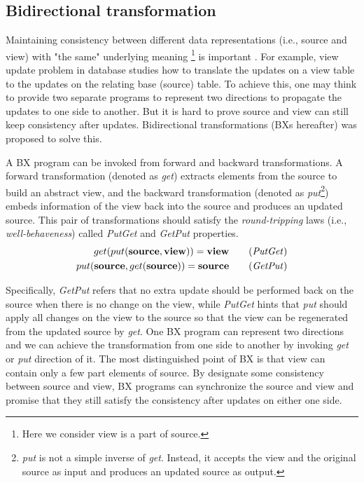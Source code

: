 \documentclass[conference]{IEEEtran}
\begin{document}
	\subsection{Bidirectional transformation}
	Maintaining consistency between different data representations (i.e., source and view) with "the same" underlying meaning \footnote{Here we consider view is a part of source.}  is important \cite{abou2018introduction}. For example, view update problem in database \cite{bancilhon1981update} studies how to translate the updates on a view table to the updates on the relating base (source) table. To achieve this, one may think to provide two separate programs to represent two directions to propagate the updates to one side to another. But it is hard to prove source and view can still keep consistency after updates. Bidirectional transformations (BXs hereafter) was proposed  \cite{czarnecki2009bidirectional} to solve this.
	
	A BX program can be invoked from forward and backward transformations. A forward transformation (denoted as \emph{get}) extracts elements from the source to build an abstract view, and the backward transformation (denoted as \emph{put}\footnote{\emph{put} is not a simple inverse of \emph{get}. Instead, it accepts the view and the original source as input and produces an updated source as output.}) embeds information of the view back into the source and produces an updated source. This pair of transformations should satisfy the {\em round-tripping} laws (i.e., {\em well-behaveness}) called \emph{PutGet} and \emph{GetPut} properties. 
	\begin{align}
	get (put(\textbf{source}, \textbf{view}))= \textbf{view} \tag {\emph{PutGet}} \\
	put (\textbf{source}, get (\textbf{source})) = \textbf{source} \tag {\emph{GetPut}} 
	\end{align}
	
	Specifically, \emph{GetPut} refers that no extra update should be performed back on the source when there is no change on the view, while \emph{PutGet} hints that \emph{put} should apply all changes on the view to the source so that the view can be regenerated from the updated source by \emph{get}. One BX program can represent two directions and we can achieve the transformation from one side to another by invoking \emph{get} or \emph{put} direction of it. The most distinguished point of BX is that view can contain only a few part elements of source. By designate some consistency between source and view, BX programs can synchronize the source and view and promise that they still satisfy the consistency after updates on either one side.
	
\end{document}
